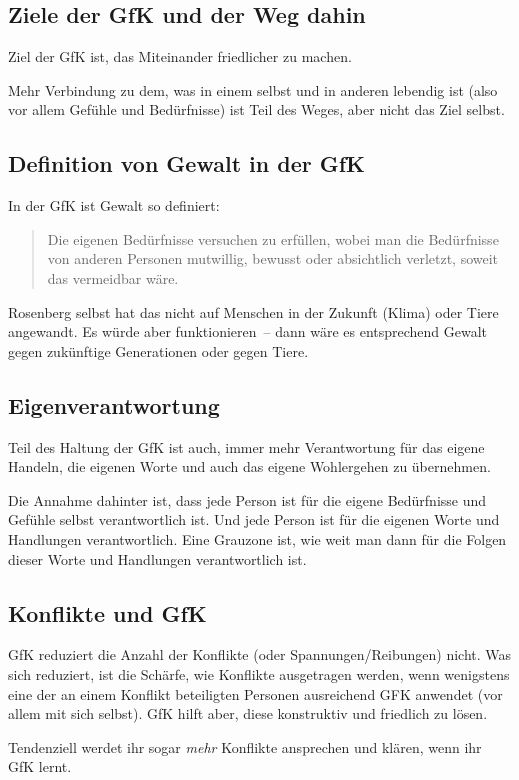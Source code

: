 \subsection{Ziele der GfK und der Weg dahin}
\label{gfk-ziele}

Ziel der GfK ist, das Miteinander friedlicher zu machen.

Mehr Verbindung zu dem, was in einem selbst und in anderen lebendig ist (also vor allem Gefühle und Bedürfnisse) ist Teil des Weges, aber nicht das Ziel selbst.


\subsection{Definition von Gewalt in der GfK}
\label{gewalt-definition}

In der GfK ist Gewalt so definiert:

\begin{quote}
  Die eigenen Bedürfnisse versuchen zu erfüllen, wobei man die Bedürfnisse von anderen Personen mutwillig, bewusst oder absichtlich verletzt, soweit das vermeidbar wäre.
\end{quote}

Rosenberg selbst hat das nicht auf Menschen in der Zukunft (Klima) oder Tiere angewandt. Es würde aber funktionieren~-- dann wäre es entsprechend Gewalt gegen zukünftige Generationen oder gegen Tiere.


\subsection{Eigenverantwortung}
\label{gfk-eigenverantwortung}

Teil des Haltung der GfK ist auch, immer mehr Verantwortung für das eigene Handeln, die eigenen Worte und auch das eigene Wohlergehen zu übernehmen.

Die Annahme dahinter ist, dass jede Person ist für die eigene Bedürfnisse und Gefühle selbst verantwortlich ist. Und jede Person ist für die eigenen Worte und Handlungen verantwortlich. Eine Grauzone ist, wie weit man dann für die Folgen dieser Worte und Handlungen verantwortlich ist.


\subsection{Konflikte und GfK}
\label{gfk-konflikte}

GfK reduziert die Anzahl der Konflikte (oder Spannungen/Reibungen) nicht. Was sich reduziert, ist die Schärfe, wie Konflikte ausgetragen werden, wenn wenigstens eine der an einem Konflikt beteiligten Personen ausreichend GFK anwendet (vor allem mit sich selbst). GfK hilft aber, diese konstruktiv und friedlich zu lösen.

Tendenziell werdet ihr sogar \emph{mehr} Konflikte ansprechen und klären, wenn ihr GfK lernt.


